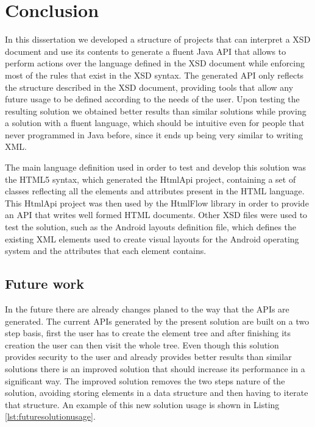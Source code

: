 \chapter{Conclusion}
\label{cha:conclusion}

In this dissertation we developed a structure of projects that can interpret a \ac{XSD} document and use its contents to generate a fluent Java \ac{API} that allows to perform actions over the language defined in the \ac{XSD} document while enforcing most of the rules that exist in the \ac{XSD} syntax. The generated \ac{API} only reflects the structure described in the \ac{XSD} document, providing tools that allow any future usage to be defined according to the needs of the user. Upon testing the resulting solution we obtained better results than similar solutions while proving a solution with a fluent language, which should be intuitive even for people that never programmed in Java before, since it ends up being very similar to writing \ac{XML}.

\noindent
The main language definition used in order to test and develop this solution was the \ac{HTML}5 syntax, which generated the HtmlApi project, containing a set of classes reflecting all the elements and attributes present in the \ac{HTML} language. This HtmlApi project was then used by the HtmlFlow library in order to provide an \ac{API} that writes well formed \ac{HTML} documents. Other \ac{XSD} files were used to test the solution, such as the Android layouts definition file, which defines the existing \ac{XML} elements used to create visual layouts for the Android operating system and the attributes that each element contains.

\section{Future work}
\label{cha:futurework}

In the future there are already changes planed to the way that the \ac{API}s are generated. The current \ac{API}s generated by the present solution are built on a two step basis, first the user has to create the element tree and after finishing its creation the user can then visit the whole tree. Even though this solution provides security to the user and already provides better results than similar solutions there is an improved solution that should increase its performance in a significant way. The improved solution removes the two steps nature of the solution, avoiding storing elements in a data structure and then having to iterate that structure. An example of this new solution usage is shown in Listing \ref{lst:futuresolutionusage}. 


